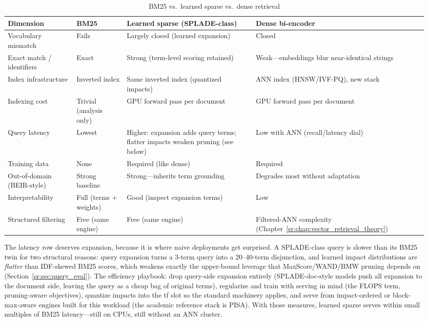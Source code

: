 \begin{table}[H]
\centering
\caption{BM25 vs.\ learned sparse vs.\ dense retrieval}
\label{sr:tab:sparse_dense}
\begin{tabularx}{\textwidth}{lXXX}
\toprule
\textbf{Dimension} & \textbf{BM25} & \textbf{Learned sparse (SPLADE-class)} & \textbf{Dense bi-encoder} \\
\midrule
Vocabulary mismatch & Fails & Largely closed (learned expansion) & Closed \\
Exact match / identifiers & Exact & Strong (term-level scoring retained) & Weak---embeddings blur near-identical strings \\
Index infrastructure & Inverted index & Same inverted index (quantized impacts) & ANN index (HNSW/IVF-PQ), new stack \\
Indexing cost & Trivial (analysis only) & GPU forward pass per document & GPU forward pass per document \\
Query latency & Lowest & Higher: expansion adds query terms; flatter impacts weaken pruning (see below) & Low with ANN (recall/latency dial) \\
Training data & None & Required (like dense) & Required \\
Out-of-domain (BEIR-style) & Strong baseline & Strong---inherits term grounding & Degrades most without adaptation \\
Interpretability & Full (terms + weights) & Good (inspect expansion terms) & Low \\
Structured filtering & Free (same engine) & Free (same engine) & Filtered-ANN complexity (Chapter~\ref{sr:chap:vector_retrieval_theory}) \\
\bottomrule
\end{tabularx}
\end{table}

The latency row deserves expansion, because it is where naive deployments get surprised. A SPLADE-class query is slower than its BM25 twin for two structural reasons: query expansion turns a 3-term query into a 20--40-term disjunction, and learned impact distributions are \emph{flatter} than IDF-skewed BM25 scores, which weakens exactly the upper-bound leverage that MaxScore/WAND/BMW pruning depends on (Section~\ref{sr:sec:query_eval}). The efficiency playbook: drop query-side expansion entirely (SPLADE-doc-style models push all expansion to the document side, leaving the query as a cheap bag of original terms), regularize and train with serving in mind (the FLOPS term, pruning-aware objectives), quantize impacts into the tf slot so the standard machinery applies, and serve from impact-ordered or block-max-aware engines built for this workload (the academic reference stack is PISA). With those measures, learned sparse serves within small multiples of BM25 latency---still on CPUs, still without an ANN cluster.

